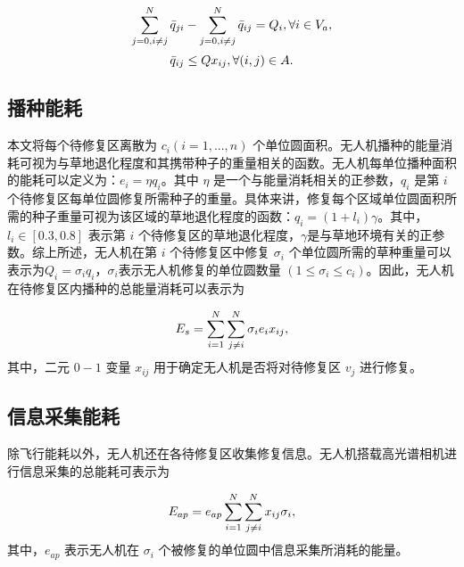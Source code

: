 \documentclass[AutoFakeBold]{LZUThesis}
\begin{document}
\begin{equation} \label{remained-weight}
	\begin{scriptsize}
		\sum^N_{j=0, i\neq j}\bar{q}_{ji} -  \sum^N_{j=0, i\neq j}\bar{q}_{ij} = Q_i, \forall i \in V_a,
	\end{scriptsize}
\end{equation}
\begin{equation} \label{demanded-weight}
	\begin{small}
		\bar{q}_{ij} \leq Q x_{ij}, \forall (i,j) \in A.
	\end{small}
\end{equation}

\subsection{播种能耗}

本文将每个待修复区离散为 $c_i(i = 1, ..., n)$ 个单位圆面积。无人机播种的能量消耗可视为与草地退化程度和其携带种子的重量相关的函数。无人机每单位播种面积的能耗可以定义为：$e_i = \eta q_i$。其中 $\eta$ 是一个与能量消耗相关的正参数，$q_i$ 是第 $i$ 个待修复区每单位圆修复所需种子的重量。具体来讲，修复每个区域单位圆面积所需的种子重量可视为该区域的草地退化程度的函数\cite{klaus2017enriching}：$q_i = (1 + l_i) \gamma$。其中，$l_i \in [0.3, 0.8]$ 表示第 $i$ 个待修复区的草地退化程度，$\gamma$是与草地环境有关的正参数。综上所述，无人机在第 $i$ 个待修复区中修复 $\sigma_i$ 个单位圆所需的草种重量可以表示为$Q_i = \sigma_i q_i$，$\sigma_i$表示无人机修复的单位圆数量 $(1\leq\sigma_i\leq c_i)$。因此，无人机在待修复区内播种的总能量消耗可以表示为

\begin{equation} \label{seeding-energy}
	\begin{small}
		E_s = \sum^N_{i = 1}\sum^N_{j \neq i}\sigma_i e_i x_{ij},
	\end{small}
\end{equation}
其中，二元 $0-1$ 变量 $x_{ij}$ 用于确定无人机是否将对待修复区 $v_j$ 进行修复。

\subsection{信息采集能耗}

除飞行能耗以外，无人机还在各待修复区收集修复信息。无人机搭载高光谱相机进行信息采集的总能耗可表示为

\begin{equation} \label{hyper-spectral-camera-energy}
	\begin{scriptsize}
		E_{ap} = e_{ap}\sum^N_{i=1}\sum^N_{j \neq i} x_{ij}\sigma_i,
	\end{scriptsize}
\end{equation}
其中，$e_{ap}$ 表示无人机在 $\sigma_i$ 个被修复的单位圆中信息采集所消耗的能量。
\end{document}
